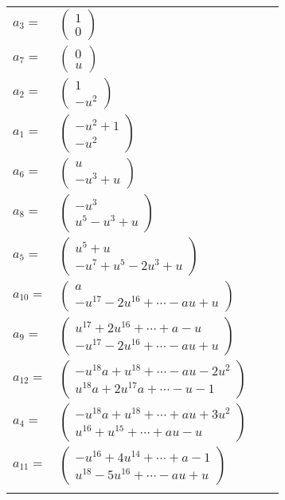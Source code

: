 \documentclass[1p]{elsarticle_modified}
\theoremstyle{definition}
\begin{document}
\begin{tabular}{m{7pt} m{180pt} m{7pt} m{180pt} }
\flushright $a_{3}=$&$\begin{pmatrix}1\\0\end{pmatrix}$ \\
\flushright $a_{7}=$&$\begin{pmatrix}0\\u\end{pmatrix}$ \\
\flushright $a_{2}=$&$\begin{pmatrix}1\\- u^2\end{pmatrix}$ \\
\flushright $a_{1}=$&$\begin{pmatrix}- u^2+1\\- u^2\end{pmatrix}$ \\
\flushright $a_{6}=$&$\begin{pmatrix}u\\- u^3+u\end{pmatrix}$ \\
\flushright $a_{8}=$&$\begin{pmatrix}- u^3\\u^5- u^3+u\end{pmatrix}$ \\
\flushright $a_{5}=$&$\begin{pmatrix}u^5+u\\- u^7+u^5-2 u^3+u\end{pmatrix}$ \\
\flushright $a_{10}=$&$\begin{pmatrix}a\\- u^{17}-2 u^{16}+\cdots- a u+u\end{pmatrix}$ \\
\flushright $a_{9}=$&$\begin{pmatrix}u^{17}+2 u^{16}+\cdots+a- u\\- u^{17}-2 u^{16}+\cdots- a u+u\end{pmatrix}$ \\
\flushright $a_{12}=$&$\begin{pmatrix}- u^{18} a+u^{18}+\cdots- a u-2 u^2\\u^{18} a+2 u^{17} a+\cdots- u-1\end{pmatrix}$ \\
\flushright $a_{4}=$&$\begin{pmatrix}- u^{18} a+u^{18}+\cdots+a u+3 u^2\\u^{16}+u^{15}+\cdots+a u- u\end{pmatrix}$ \\
\flushright $a_{11}=$&$\begin{pmatrix}- u^{16}+4 u^{14}+\cdots+a-1\\u^{18}-5 u^{16}+\cdots- a u+u\end{pmatrix}$\\&\end{tabular}
\end{document}
